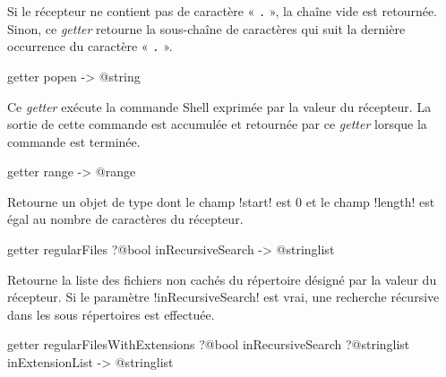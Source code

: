 Si le récepteur ne contient pas de caractère « \texttt{.} », la chaîne vide est retournée. Sinon, ce \emph{getter} retourne la sous-chaîne de caractères qui suit la dernière occurrence du caractère « \texttt{.} ».









\begin{galgasbox}
getter popen -> @string
\end{galgasbox}

Ce \emph{getter} exécute la commande Shell exprimée par la valeur du récepteur. La sortie de cette commande est accumulée et retournée par ce \emph{getter} lorsque la commande est terminée.









\begin{galgasbox}
getter range -> @range
\end{galgasbox}

Retourne un objet de type  dont le champ \ggs!start! est $0$ et le champ \ggs!length! est égal au nombre de caractères du récepteur.









\begin{galgasbox}
getter regularFiles ?@bool inRecursiveSearch -> @stringlist
\end{galgasbox}

Retourne la liste des fichiers non cachés du répertoire désigné par la valeur du récepteur. Si le paramètre \ggs!inRecursiveSearch! est vrai, une recherche récursive dans les sous répertoires est effectuée.










\begin{galgasbox}
getter regularFilesWithExtensions
    ?@bool inRecursiveSearch
    ?@stringlist inExtensionList -> @stringlist
\end{galgasbox}

